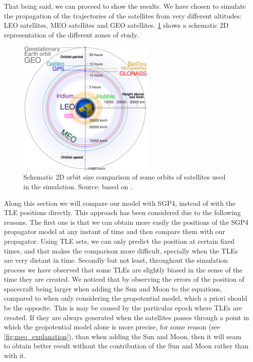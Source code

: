 \documentclass[../main.tex]{subfiles}
\begin{document}
That being said, we can proceed to show the results. We have chosen to simulate the propagation of the trajectories of the satellites from very different altitudes: LEO satellites, MEO satellites and GEO satellites. \cref{fig:satellite_orbits} shows a schematic 2D representation of the different zones of study.
\begin{figure}[ht]
  \centering
  \includegraphics[width=0.6\textwidth]{Images/satellite_orbits_custom.pdf}
  \caption{Schematic 2D orbit size comparison of some orbits of satellites used in the simulation. Source: based on \cite{wiki:sat_orbits}.}
  \label{fig:satellite_orbits}
\end{figure}

Along this section we will compare our model with SGP4, instead of with the TLE positions directly. This approach has been considered due to the following reasons. The first one is that we can obtain more easily the positions of the SGP4 propagator model at any instant of time and then compare them with our propagator. Using TLE sets, we can only predict the position at certain fixed times, and that makes the comparison more difficult, specially when the TLEs are very distant in time. Secondly but not least, throughout the simulation process we have observed that some TLEs are slightly biased in the sense of the time they are created. We noticed that by observing the errors of the position of spacecraft being larger when adding the Sun and Moon to the equations, compared to when only considering the geopotential model, which a priori should be the opposite. This is may be caused by the particular epoch where TLEs are created. If they are always generated when the satellites passes through a point in which the geopotential model alone is more precise, for some reason (see \cref{fig:meo_explanation}), than when adding the Sun and Moon, then it will seam to obtain better result without the contribution of the Sun and Moon rather than with it.
\end{document}
